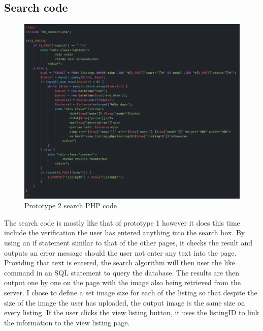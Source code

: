 \subsection{Search code}
\begin{figure}[H]
    \centering
    \includegraphics[scale=0.5]{ch3_developing/proto2/proto2_search.png}
    \caption{Prototype 2 search PHP code}
    \label{fig:proto2_search}
\end{figure}
The search code is mostly like that of prototype 1 however it does this time include the verification the user has entered anything into the search box. By using an if statement similar to that of the other pages, it checks the result and outputs an error message should the user not enter any text into the page. Providing that text is entered, the search algorithm will then user the like command in an SQL statement to query the database. The results are then output one by one on the page with the image also being retrieved from the server. I chose to define a set image size for each of the listing so that despite the size of the image the user has uploaded, the output image is the same size on every listing. If the user clicks the view listing button, it uses the listingID to link the information to the view listing page.  

